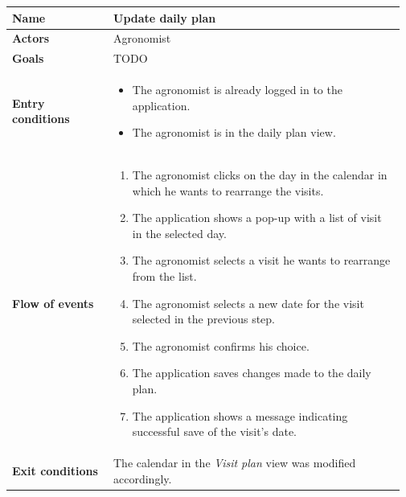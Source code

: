 \begin{table}[H]
    \centering
	\begin{tabular}{@{}p{0.25\linewidth} p{0.72\linewidth}@{}}
        \toprule
		\textbf{Name}               & Update daily plan \todo{define specific cases!}\\
		\midrule
		\textbf{Actors}             & Agronomist\\
		\midrule
		\textbf{Goals}              & TODO \\
		\midrule
		
		\textbf{Entry conditions}   & \begin{itemize}[leftmargin=.4cm,noitemsep,topsep=0pt,before=\vspace{-3mm},after=\vspace{-4mm}]
		    \item The agronomist is already logged in to the application.
		    \item The agronomist is in the daily plan view.
		\end{itemize}\\
		\midrule
		
		\textbf{Flow of events}     & \begin{enumerate}[leftmargin=.4cm,noitemsep,topsep=0pt,before=\vspace{-3mm},after=\vspace{-4mm}]
		    \item The agronomist clicks on the day in the calendar in which he wants to rearrange the visits.
		    \item The application shows a pop-up with a list of visit in the selected day.
		    \item The agronomist selects a visit he wants to rearrange from the list.
		    \item The agronomist selects a new date for the visit selected in the previous step.
		    \item The agronomist confirms his choice.
		    \item The application saves changes made to the daily plan.
		    \item The application shows a message indicating successful save of the visit's date.
		\end{enumerate}\\
		\midrule
		\textbf{Exit conditions}    & The calendar in the \textit{Visit plan} view was modified accordingly. \\
		\midrule
		

\end{tabular}
\end{table}
